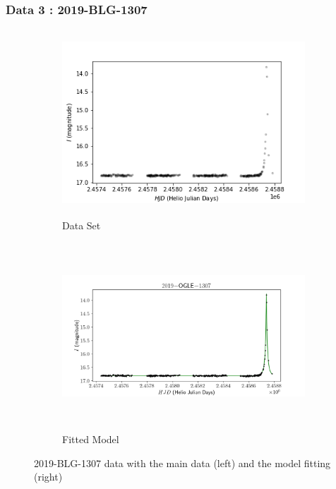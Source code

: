\documentclass{article}
\begin{document}
\subsubsection{Data 3 : 2019-BLG-1307}
        \begin{figure}[H]
            \begin{subfigure}{0.5\textwidth}
                \includegraphics[width=1\linewidth, height=7cm]{Images/2019-BLG-1307_Original_Data.png} 
                \caption{Data Set}
                \label{fig:Sub-Event-One-Main}
            \end{subfigure}
            \begin{subfigure}{0.5\textwidth}
                \includegraphics[width=1\linewidth, height=7cm]{Images/2019-BLG-1307_Original_Data_Model_fitted.png}
                \caption{Fitted Model}
                \label{fig:Sub-Event-One-Alt}
            \end{subfigure}
        \caption{2019-BLG-1307 data with the main data (left) and the model fitting (right)}
        \label{fig:image2}
        \end{figure}
    
\end{document}
